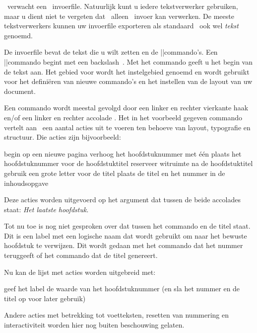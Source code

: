 {\switchnaarkorps[9pt]\typebuffer}

\CONTEXT\ verwacht een \ASCII\ invoerfile. Natuurlijk kunt u
iedere tekstverwerker gebruiken, maar u dient niet te
vergeten dat \CONTEXT\ alleen \ASCII\ invoer kan verwerken.
De meeste tekstverwerkers kunnen uw invoerfile exporteren
als standaard \ASCII\ ook wel {\em tekst} genoemd.

De invoerfile bevat de tekst die u wilt zetten en de
\CONTEXT||commando's. Een \CONTEXT||commando begint met een
backslash~\tex{}. Met het commando \type{\starttekst} geeft
u het begin van de tekst aan. Het gebied voor
\type{\starttekst} wordt het instelgebied genoemd en wordt
gebruikt voor het defini\"eren van nieuwe commando's en het
instellen van de layout van uw document.

Een commando wordt meestal gevolgd door een linker en
rechter vierkante haak \type{[]} en/of een linker en rechter
accolade \type{{}}. Het in het voorbeeld gegeven commando
vertelt aan \CONTEXT\ een aantal acties uit te voeren ten
behoeve van layout, typografie en structuur. Die acties zijn
bijvoorbeeld:

\startopsomming[n,opelkaar]
\som begin op een nieuwe pagina
\som verhoog het hoofdstuknummer met \'e\'en
\som plaats het hoofdstuknummer voor de hoofdstuktitel
\som reserveer witruimte na de hoofdstuktitel
\som gebruik een grote letter voor de titel
\som plaats de titel en het nummer in de inhoudsopgave
\stopopsomming

Deze acties worden uitgevoerd op het argument dat tussen de
beide accolades staat: {\em Het laatste hoofdstuk}.

Tot nu toe is nog niet gesproken over  dat tussen het commando en de titel staat. Dit
is een label met een logische naam dat wordt gebruikt om
naar het bewuste hoofdstuk te verwijzen. Dit wordt gedaan
met het commando  dat het
nummer teruggeeft of het commando  dat de titel genereert.

Nu kan de lijst met acties worden uitgebreid met:

\startopsomming[verder]
\som geef het label  de waarde van
     het hoofdstuknummer (en sla het nummer en de titel
     op voor later gebruik)
\stopopsomming

Andere acties met betrekking tot voetteksten, resetten van
nummering en interactiviteit worden hier nog buiten
beschouwing gelaten.

